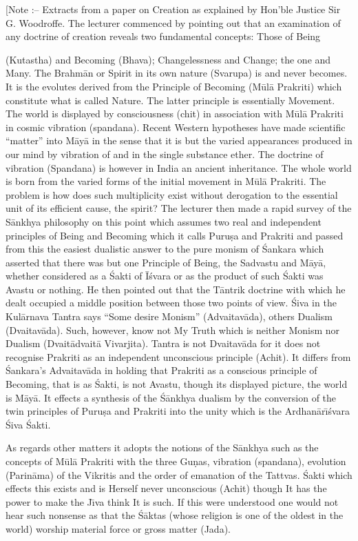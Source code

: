 [Note :-- Extracts from a paper on Creation as explained by Hon'ble Justice Sir G. Woodroffe.
The lecturer commenced by pointing out that an examination of any doctrine of creation reveals two fundamental concepts: Those of Being

(Kutastha) and Becoming (Bhava); Changelessness and Change; the one and Many. The Brahm\=an or Spirit in its own nature (Svarupa) is and never becomes. It is the evolutes derived from the Principle of Becoming (M\=ul\=a Prakriti) which constitute what is called Nature. The latter principle is essentially Movement. The world is displayed by consciousness (chit) in association with M\=ul\=a Prakriti in cosmic vibration (spandana). Recent Western hypotheses have made scientific ``matter'' into M\=ay\=a in the sense that it is but the varied appearances produced in our mind by vibration of and in the single substance ether. The doctrine of vibration (Spandana) is however in India an ancient inheritance. The whole world is born from the varied forms of the initial movement in M\=ul\=a Prakriti. The problem is how does such multiplicity exist without derogation to the essential unit of its efficient cause, the spirit? The lecturer then made a rapid survey of the S\=ankhya philosophy on this point which assumes two real and independent principles of Being and Becoming which it calls Puru\d{s}a and Prakriti and passed from this the easiest dualistic answer to the pure monism of \'Sankara which asserted that there was but one Principle of Being, the Sadvastu and M\=ay\=a, whether considered as a \'Sakti of \=I\'svara or as the product of such \'Sakti was Avastu or nothing. He then pointed out that the T\=antrik doctrine with which he dealt occupied a middle position between those two points of view. \'Siva in the Kul\=arnava Tantra says ``Some desire Monism'' (Advaitav\=ada), others Dualism (Dvaitav\=ada). Such, however, know not My Truth which is neither Monism nor Dualism (Dvait\=advait\=a Vivarjita). Tantra is not Dvaitav\=ada for it does not recognise Prakriti as an independent unconscious principle (Achit). It differs from \'Sankara's Advaitav\=ada in holding that Prakriti as a conscious principle of Becoming, that is as \'Sakti, is not Avastu, though its displayed picture, the world is M\=ay\=a. It effects a synthesis of the \'S\=ankhya dualism by the conversion of the twin principles of Puru\d{s}a and Prakriti into the unity which is the Ardhan\=ar\={\i}\'svara \'Siva \'Sakti.

As regards other matters it adopts the notions of the S\=ankhya such as the concepts of M\=ul\=a Prakriti with the three Gu\d{n}as, vibration (spandana), evolution (Parin\=ama) of the Vikritis and the order of emanation of the Tattvas. \'Sakti which effects this exists and is Herself never unconscious (Achit) though It has the power to make the J\={\i}va think It is such. If this were understood one would not hear such nonsense as that the \'S\=aktas (whose religion is one of the oldest in the world) worship material force or gross matter (Jada).

